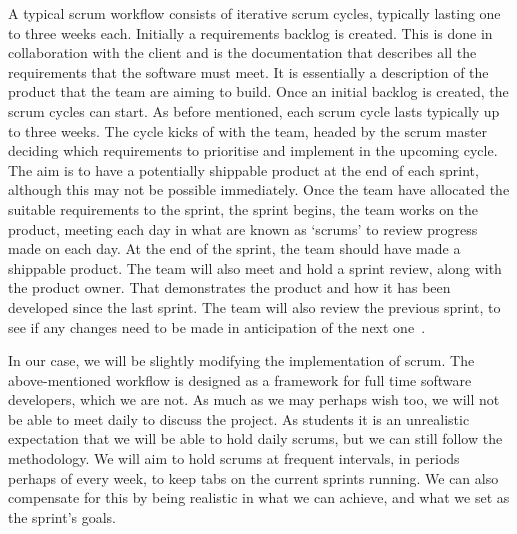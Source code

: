             A typical scrum workflow consists of iterative scrum
            cycles, typically lasting one to three weeks each. Initially a requirements backlog is created.  This is
            done in collaboration with the client and is the documentation that describes all the requirements that the
            software must meet. It is essentially a description of the product that the team are aiming to build. Once
            an initial backlog is created, the scrum cycles can start. As before mentioned, each scrum cycle lasts
            typically up to three weeks. The cycle kicks of with the team, headed by the scrum master deciding which
            requirements to prioritise and implement in the upcoming cycle. The aim is to have a potentially shippable
            product at the end of each sprint, although this may not be possible immediately. Once the team have
            allocated the suitable requirements to the sprint, the sprint begins, the team works on the product, meeting
            each day in what are known as ‘scrums’ to review progress made on each day. At the end of the sprint, the
            team should have made a shippable product. The team will also meet and hold a sprint review, along with the
            product owner. That demonstrates the product and how it has been developed since the last sprint. The team
            will also review the previous sprint, to see if any changes need to be made in anticipation of the next
            one~\cite{nuevo_2011_scrumbased}. 
            
            In our case, we will be slightly modifying the implementation of scrum.
            The above-mentioned workflow is designed as a framework for full time software developers, which we are not.
            As much as we may perhaps wish too, we will not be able to meet daily to discuss the project. As students it
            is an unrealistic expectation that we will be able to hold daily scrums, but we can still follow the
            methodology. We will aim to hold scrums at frequent intervals, in periods perhaps of every week, to keep
            tabs on the current sprints running. We can also compensate for this by being realistic in what we can
            achieve, and what we set as the sprint’s goals. 
            

